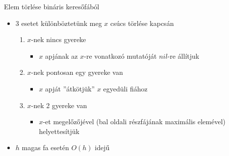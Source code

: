 \documentclass{beamer}
\begin{document}
\begin{frame}{Elem törlése bináris keresőfából}
\pause
	\begin{itemize}
		\item 3 esetet különböztetünk meg $x$ csúcs törlése kapcsán
		\begin{enumerate}
			\item $x$-nek nincs gyereke
			\begin{itemize}
				\item $x$ apjának az $x$-re vonatkozó mutatóját $nil$-re állítjuk
			\end{itemize}
			\item $x$-nek pontosan egy gyereke van
			\begin{itemize}
				\item $x$ apját ''átkötjük'' $x$ egyedüli fiához
			\end{itemize}
			\item $x$-nek 2 gyereke van
			\begin{itemize}
				\item $x$-et megelőzőjével (bal oldali részfájának maximális elemével) helyettesítjük
			\end{itemize}
		\end{enumerate}
		\item $h$ magas fa esetén $O(h)$ idejű
	\end{itemize}
\end{frame}
\end{document}
